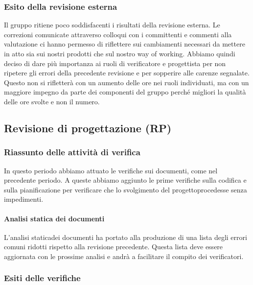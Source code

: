 \subsubsection{Esito della revisione esterna}
Il gruppo ritiene poco soddisfacenti i risultati della revisione esterna. 
Le correzioni comunicate attraverso colloqui con i committenti e commenti alla valutazione ci hanno permesso di riflettere sui cambiamenti necessari da mettere in atto sia sui nostri prodotti che sul nostro way of working\glo.
Abbiamo quindi deciso di dare più importanza ai ruoli di verificatore e progettista per non ripetere gli errori della precedente revisione e per sopperire alle carenze segnalate.
Questo non si rifletterà con un aumento delle ore nei ruoli individuati, ma con un maggiore impegno da parte dei componenti del gruppo perché migliori la qualità delle ore svolte e non il numero.

\subsection{Revisione di progettazione (RP)}
\subsubsection{Riassunto delle attività di verifica}
In questo periodo abbiamo attuato le verifiche sui documenti, come nel precedente periodo. A queste abbiamo aggiunto le prime verifiche sulla codifica e sulla pianificazione per verificare che lo svolgimento del progetto\glosp procedesse senza impedimenti.  
\paragraph{Analisi statica dei documenti}
L'analisi statica\glosp dei documenti ha portato alla produzione di una lista degli errori comuni ridotti rispetto alla revisione precedente. Questa lista deve essere aggiornata con le prossime analisi e andrà a facilitare il compito dei verificatori.
\subsubsection{Esiti delle verifiche} 
